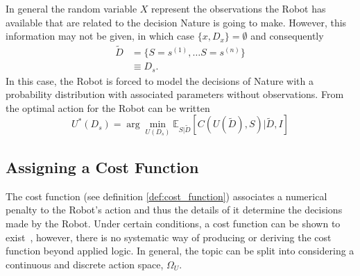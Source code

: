 \begin{example}
	In general the random variable $X$ represent the observations the Robot has available that are related to the decision Nature is going to make. However, this information may not be given, in which case $\{x,D_x\}=\emptyset$ and consequently
	\begin{equation}
		\begin{split}
			\tilde{D} &= \{S =s^{(1)},\dots S=s^{(n)}\}\\
			&\equiv D_s.
		\end{split}
	\end{equation}
	In this case, the Robot is forced to model the decisions of Nature with a probability distribution with associated parameters without observations. From  the optimal action for the Robot can be written
	\begin{equation}
		U^*(D_s) = \arg\min_{U(D_s)} \mathbb{E}_{S|\tilde{D}}[C(U(\tilde{D}), S)|\tilde{D},I]
		\label{eq:best_decision1}
	\end{equation}
\end{example}

\subsection{Assigning a Cost Function}
\label{sec:assing_cost}
The cost function (see definition \ref{def:cost_function}) associates a numerical penalty to the Robot's action and thus the details of it determine the decisions made by the Robot. Under certain conditions, a cost function can be shown to exist~\citep{lavalle2006planning}, however, there is no systematic way of producing or deriving the cost function beyond applied logic. In general, the topic can be split into considering a continuous and discrete action space, $\Omega_U$. 	

